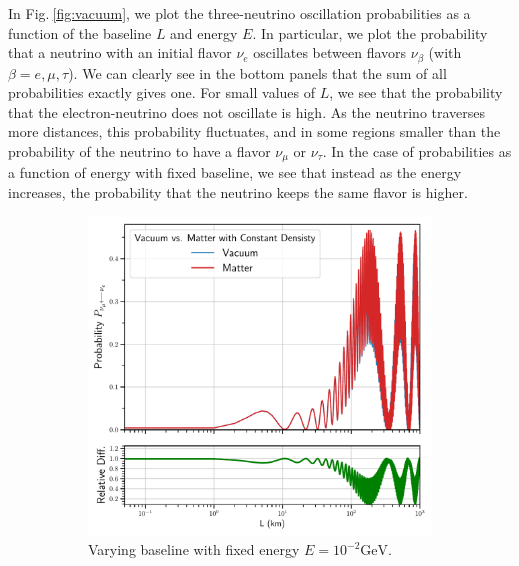 \documentclass[twocolumn,secnumarabic,amssymb, nobibnotes, aps, prd,10pt]{revtex4-1}
\newcommand{\Fig}[1]{Fig.$\:$\ref{#1}}
\begin{document}
In \Fig{fig:vacuum}, we plot the three-neutrino oscillation probabilities as a function of
the baseline $L$ and energy $E$. In particular, we plot the probability that a neutrino
with an initial flavor $\nu_e$ oscillates between flavors $\nu_\beta$ (with $\beta = e,
\mu, \tau$). We can clearly see in the bottom panels that the sum of all probabilities
exactly gives one. For small values of $L$, we see that the probability that the 
electron-neutrino does not oscillate is high. As the neutrino traverses more distances,
this probability fluctuates, and in some regions smaller than the probability of the
neutrino to have a flavor $\nu_\mu$ or $\nu_\tau$. In the case of probabilities as a
function of energy with fixed baseline, we see that instead as the energy increases, the
probability that the neutrino keeps the same flavor is higher.
\begin{figure}
\captionsetup[subfigure]{aboveskip=-1.5pt,belowskip=-1.5pt} 
\begin{subfigure}{1.05\linewidth}
\includegraphics[width=\linewidth]{DistVacMatt.pdf}
\caption{Varying baseline with fixed energy $E=10^{-2} \mathrm{GeV}$.} 
\end{subfigure} 
\\
\begin{subfigure}{1.05\linewidth}

\end{subfigure}
\end{figure}
\end{document}
